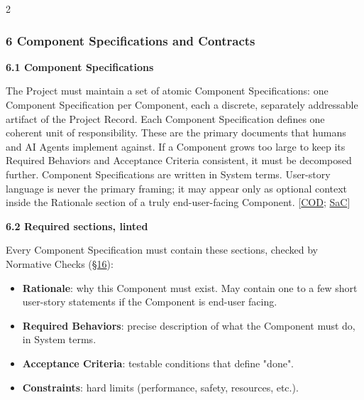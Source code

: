 \begin{multicols}{2}
\hypertarget{nss-6}{}

\subsubsection*{6 Component Specifications and Contracts}

\hypertarget{nss-6.1}{}

\par\smallskip\noindent\textbf{6.1 Component Specifications}\par\nopagebreak

The Project must maintain a set of atomic Component Specifications: one Component Specification per Component, each a discrete, separately addressable artifact of the Project Record. Each Component Specification defines one coherent unit of responsibility. These are the primary documents that humans and AI Agents implement against. If a Component grows too large to keep its Required Behaviors and Acceptance Criteria consistent, it must be decomposed further. Component Specifications are written in System terms. User-story language is never the primary framing; it may appear only as optional context inside the Rationale section of a truly end-user-facing Component. [\hyperlink{gp-COD}{COD}; \hyperlink{gp-SaC}{SaC}]

\hypertarget{nss-6.2}{}

\par\smallskip\noindent\textbf{6.2 Required sections, linted}\par\nopagebreak

Every Component Specification must contain these sections, checked by Normative Checks (\hyperlink{nss-16}{\S16}):

\begin{itemize}\setlength{\itemsep}{0pt}\setlength{\parskip}{0pt}

\item \textbf{Rationale}: why this Component must exist. May contain one to a few short user-story statements if the Component is end-user facing.

\item \textbf{Required Behaviors}: precise description of what the Component must do, in System terms.

\item \textbf{Acceptance Criteria}: testable conditions that define "done".

\item \textbf{Constraints}: hard limits (performance, safety, resources, etc.).


\end{itemize}
\end{multicols}
